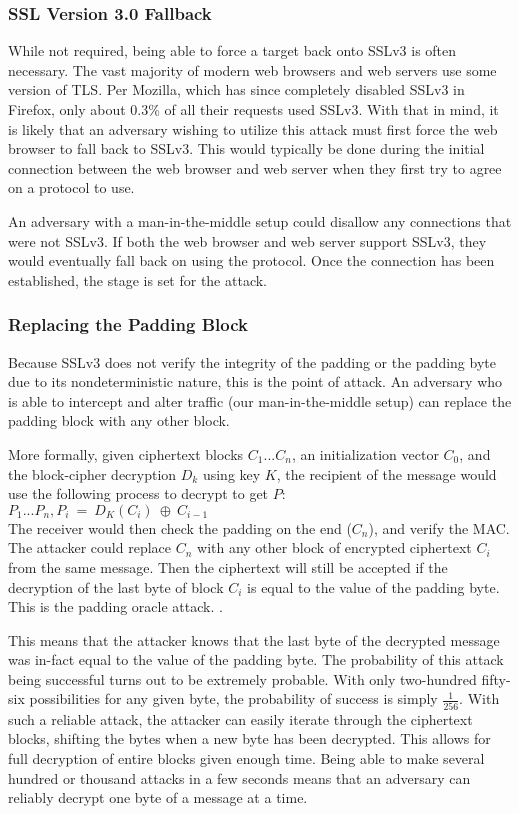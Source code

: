 \documentclass[10pt]{article}
\begin{document}
\subsubsection*{SSL Version 3.0 Fallback}
While not required, being able to force a target back onto SSLv3 is often necessary.
The vast majority of modern web browsers and web servers use some version of TLS.
Per Mozilla, which has since completely disabled SSLv3 in Firefox, only about
0.3\% of all their requests used SSLv3.\cite{MozillaPOODLE} With that in mind,
it is likely that an adversary wishing to utilize this attack must first force
the web browser to fall back to SSLv3. This would typically be done during the
initial connection between the web browser and web server when they first try
to agree on a protocol to use. 

An adversary with a man-in-the-middle setup could disallow any connections
that were not SSLv3. If both the web browser and web server support SSLv3, they
would eventually fall back on using the protocol.\cite{POODLE} Once the connection
has been established, the stage is set for the attack.

\subsubsection*{Replacing the Padding Block}
Because SSLv3 does not verify the integrity of the padding or the padding byte
due to its nondeterministic nature, this is the point of attack. An adversary
who is able to intercept and alter traffic (our man-in-the-middle setup) can
replace the padding block with any other block.

More formally, given ciphertext blocks $C_1 ... C_n$, an initialization vector
$C_0$, and the block-cipher decryption $D_k$ using key $K$, the recipient of
the message would use the following process to decrypt to get $P$:\cite{POODLE}\\

\noindent $P_1 ... P_n, P_i\ =\ D_K(C_i)\ \oplus\ C_{i-1}$\\

The receiver would then check the padding on the end ($C_n$), and verify the
MAC. The attacker could replace $C_n$ with any other block of encrypted
ciphertext $C_i$ from the same message. Then the ciphertext will still be
accepted if the decryption of the last byte of block $C_i$ is equal to the
value of the padding byte. This is the padding oracle attack. \cite{POODLE}.

This means that the attacker knows that the last byte of the decrypted message
was in-fact equal to the value of the padding byte. The probability of this
attack being successful turns out to be extremely probable. With only two-hundred
fifty-six possibilities for any given byte, the probability of success is simply
$\frac{1}{256}$. With such a reliable attack, the attacker can easily iterate
through the ciphertext blocks, shifting the bytes when a new byte has been
decrypted. This allows for full decryption of entire blocks given enough time.
Being able to make several hundred or thousand attacks in a few seconds means 
that an adversary can reliably decrypt one byte of a message at a time.
\end{document}
